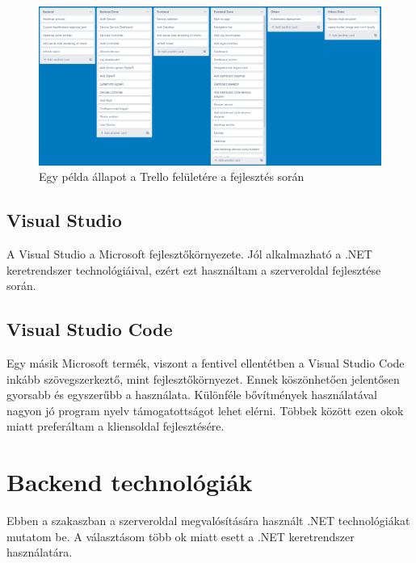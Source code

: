 \begin{figure}[!ht]
    \centering
    \includegraphics[width=150mm, keepaspectratio]{figures/trello-3.png}
    \caption{Egy példa állapot a Trello felületére a fejlesztés során}
    \label{fig:trello}
\end{figure}

\subsection{Visual Studio}
A Visual Studio \cite{vs} a Microsoft fejlesztőkörnyezete. Jól alkalmazható a .NET keretrendszer technológiáival, ezért ezt használtam a szerveroldal fejlesztése során.

\subsection{Visual Studio Code}
Egy másik Microsoft termék, viszont a fentivel ellentétben a Visual Studio Code \cite{vs-code} inkább szövegszerkeztő, mint fejlesztőkörnyezet.
Ennek köszönhetően jelentősen gyorsabb és egyszerűbb a használata. Különféle bővítmények használatával nagyon jó program nyelv támogatottságot lehet elérni.
Többek között ezen okok miatt preferáltam a kliensoldal fejlesztésére. 

\section{Backend technológiák}
Ebben a szakaszban a szerveroldal megvalósítására használt .NET technológiákat mutatom be. A választásom több ok miatt esett a .NET keretrendszer használatára.


